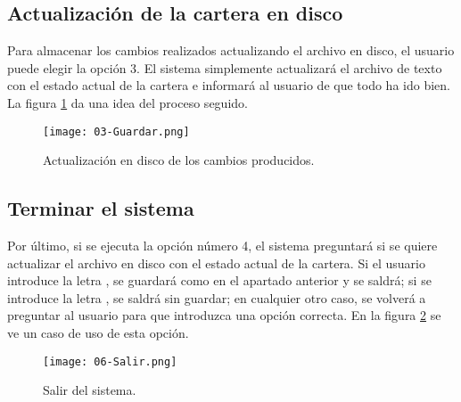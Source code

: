 \documentclass[a4paper, 11pt, titlepage]{article}
\begin{document}
    \subsection{Actualización de la cartera en disco}

    Para almacenar los cambios realizados actualizando el archivo en disco, el usuario puede elegir la opción 3. El sistema simplemente actualizará el archivo de texto con el estado actual de la cartera e informará al usuario de que todo ha ido bien. La figura \ref{fig:guardar} da una idea del proceso seguido.

    \begin{center}
        \begin{figure}[!htb]
            \centering
            \texttt{[image: 03-Guardar.png]}
            \caption{Actualización en disco de los cambios producidos.}
            \label{fig:guardar}
        \end{figure}
    \end{center}


    \subsection{Terminar el sistema}

    Por último, si se ejecuta la opción número 4, el sistema preguntará si se quiere actualizar el archivo en disco con el estado actual de la cartera. Si el usuario introduce la letra , se guardará como en el apartado anterior y se saldrá; si se introduce la letra , se saldrá sin guardar; en cualquier otro caso, se volverá a preguntar al usuario para que introduzca una opción correcta. En la figura \ref{fig:salir} se ve un caso de uso de esta opción.

    \begin{center}
        \begin{figure}[!htb]
            \centering
            \texttt{[image: 06-Salir.png]}
            \caption{Salir del sistema.}
            \label{fig:salir}
        \end{figure}
    \end{center}
\end{document}

